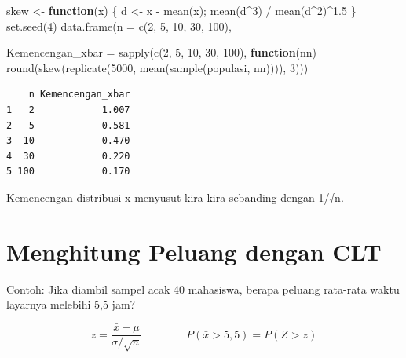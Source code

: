 \documentclass[
  indonesian,
  letterpaper,
]{book}
\newenvironment{Shaded}{\begin{snugshade}}{\end{snugshade}}
\newcommand{\AttributeTok}[1]{\textcolor[rgb]{0.40,0.45,0.13}{#1}}
\newcommand{\ControlFlowTok}[1]{\textcolor[rgb]{0.00,0.23,0.31}{\textbf{#1}}}
\newcommand{\DecValTok}[1]{\textcolor[rgb]{0.68,0.00,0.00}{#1}}
\newcommand{\FloatTok}[1]{\textcolor[rgb]{0.68,0.00,0.00}{#1}}
\newcommand{\FunctionTok}[1]{\textcolor[rgb]{0.28,0.35,0.67}{#1}}
\newcommand{\NormalTok}[1]{\textcolor[rgb]{0.00,0.23,0.31}{#1}}
\newcommand{\OtherTok}[1]{\textcolor[rgb]{0.00,0.23,0.31}{#1}}
\newcommand{\SpecialCharTok}[1]{\textcolor[rgb]{0.37,0.37,0.37}{#1}}
\begin{document}
\begin{Shaded}
\begin{Highlighting}[]
\NormalTok{skew }\OtherTok{\textless{}{-}} \ControlFlowTok{function}\NormalTok{(x) \{ d }\OtherTok{\textless{}{-}}\NormalTok{ x }\SpecialCharTok{{-}} \FunctionTok{mean}\NormalTok{(x); }\FunctionTok{mean}\NormalTok{(d}\SpecialCharTok{\^{}}\DecValTok{3}\NormalTok{) }\SpecialCharTok{/} \FunctionTok{mean}\NormalTok{(d}\SpecialCharTok{\^{}}\DecValTok{2}\NormalTok{)}\SpecialCharTok{\^{}}\FloatTok{1.5}\NormalTok{ \}}
\FunctionTok{set.seed}\NormalTok{(}\DecValTok{4}\NormalTok{)}
\FunctionTok{data.frame}\NormalTok{(}\AttributeTok{n =} \FunctionTok{c}\NormalTok{(}\DecValTok{2}\NormalTok{, }\DecValTok{5}\NormalTok{, }\DecValTok{10}\NormalTok{, }\DecValTok{30}\NormalTok{, }\DecValTok{100}\NormalTok{),}

\AttributeTok{Kemencengan\_xbar =} \FunctionTok{sapply}\NormalTok{(}\FunctionTok{c}\NormalTok{(}\DecValTok{2}\NormalTok{, }\DecValTok{5}\NormalTok{, }\DecValTok{10}\NormalTok{, }\DecValTok{30}\NormalTok{, }\DecValTok{100}\NormalTok{), }\ControlFlowTok{function}\NormalTok{(nn)}
\FunctionTok{round}\NormalTok{(}\FunctionTok{skew}\NormalTok{(}\FunctionTok{replicate}\NormalTok{(}\DecValTok{5000}\NormalTok{, }\FunctionTok{mean}\NormalTok{(}\FunctionTok{sample}\NormalTok{(populasi, nn)))), }\DecValTok{3}\NormalTok{)))}
\end{Highlighting}
\end{Shaded}

\begin{verbatim}
    n Kemencengan_xbar
1   2            1.007
2   5            0.581
3  10            0.470
4  30            0.220
5 100            0.170
\end{verbatim}

Kemencengan distribusi ̄x menyusut kira-kira sebanding dengan 1/√n.

\section{Menghitung Peluang dengan
CLT}\label{menghitung-peluang-dengan-clt}

Contoh: Jika diambil sampel acak 40 mahasiswa, berapa peluang rata-rata
waktu layarnya melebihi 5,5 jam?

\[z = \frac{\bar{x} - \mu}{\sigma / \sqrt{n}} \qquad\qquad P(\bar{x} > 5{,}5) = P(Z > z)\]
\end{document}
